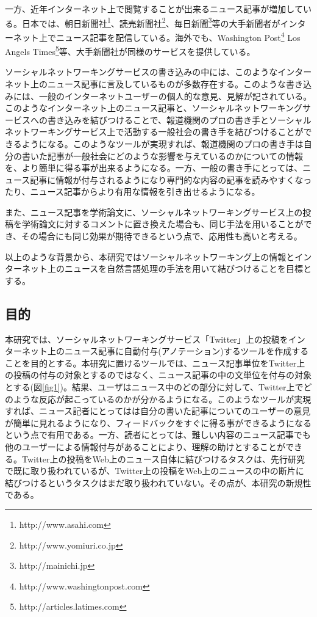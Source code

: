 \documentclass[12pt]{jarticle}
\begin{document}
一方、近年インターネット上で閲覧することが出来るニュース記事が増加している。日本では、朝日新聞社\footnote{http://www.asahi.com}、読売新聞社\footnote{http://www.yomiuri.co.jp}、毎日新聞\footnote{http://mainichi.jp}等の大手新聞者がインターネット上でニュース記事を配信している。海外でも、Washington Post\footnote{http://www.washingtonpost.com} Los Angels Times\footnote{http://articles.latimes.com}等、大手新聞社が同様のサービスを提供している。

ソーシャルネットワーキングサービスの書き込みの中には、このようなインターネット上のニュース記事に言及しているものが多数存在する。このような書き込みには、一般のインターネットユーザーの個人的な意見、見解が記されている。このようなインターネット上のニュース記事と、ソーシャルネットワーキングサービスへの書き込みを結びつけることで、報道機関のプロの書き手とソーシャルネットワーキングサービス上で活動する一般社会の書き手を結びつけることができるようになる。このようなツールが実現すれば、報道機関のプロの書き手は自分の書いた記事が一般社会にどのような影響を与えているのかについての情報を、より簡単に得る事が出来るようになる。一方、一般の書き手にとっては、ニュース記事に情報が付与されるようになり専門的な内容の記事を読みやすくなったり、ニュース記事からより有用な情報を引き出せるようになる。

また、ニュース記事を学術論文に、ソーシャルネットワーキングサービス上の投稿を学術論文に対するコメントに置き換えた場合も、同じ手法を用いることができ、その場合にも同じ効果が期待できるという点で、応用性も高いと考える。

以上のような背景から、本研究ではソーシャルネットワーキング上の情報とインターネット上のニュースを自然言語処理の手法を用いて結びつけることを目標とする。

\newpage

\subsection{目的}
本研究では、ソーシャルネットワーキングサービス「Twitter」上の投稿をインターネット上のニュース記事に自動付与(アノテーション)するツールを作成することを目的とする。本研究に置けるツールでは、ニュース記事単位をTwitter上の投稿の付与の対象とするのではなく、ニュース記事の中の文単位を付与の対象とする(図\ref{fig1})。結果、ユーザはニュース中のどの部分に対して、Twitter上でどのような反応が起こっているのかが分かるようになる。このようなツールが実現すれば、ニュース記者にとってはは自分の書いた記事についてのユーザーの意見が簡単に見れるようになり、フィードバックをすぐに得る事ができるようになるという点で有用である。一方、読者にとっては、難しい内容のニュース記事でも他のユーザーによる情報付与があることにより、理解の助けとすることができる。Twitter上の投稿をWeb上のニュース自体に結びつけるタスクは、先行研究で既に取り扱われているが、Twitter上の投稿をWeb上のニュースの中の断片に結びつけるというタスクはまだ取り扱われていない。その点が、本研究の新規性である。
\end{document}

